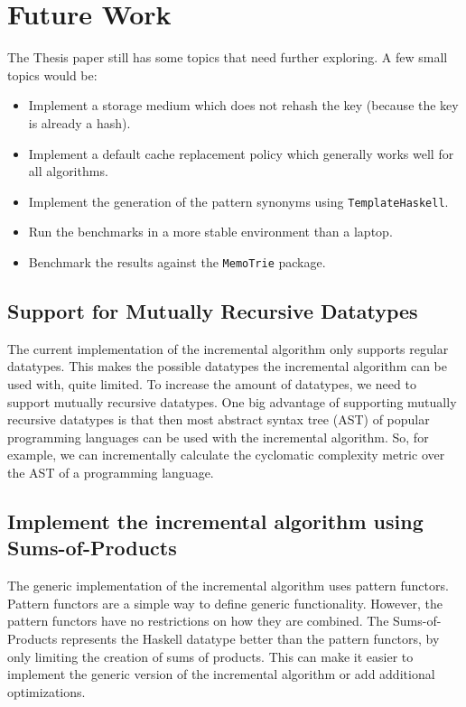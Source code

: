 \section{Future Work}

The Thesis paper still has some topics that need further exploring. A few small topics would be: 
\begin{itemize}
  \item Implement a storage medium which does not rehash the key (because the key is already a hash).
  \item Implement a default cache replacement policy which generally works well for all algorithms. 
  \item Implement the generation of the pattern synonyms using \texttt{TemplateHaskell}.
  \item Run the benchmarks in a more stable environment than a laptop.
  \item Benchmark the results against the \texttt{MemoTrie} package.
\end{itemize}

\subsection{Support for Mutually Recursive Datatypes}
The current implementation of the incremental algorithm only supports regular datatypes. This makes the possible datatypes the incremental algorithm can be used with, quite limited. To increase the amount of datatypes, we need to support mutually recursive datatypes. One big advantage of supporting mutually recursive datatypes is that then most abstract syntax tree (AST) of popular programming languages can be used with the incremental algorithm. So, for example, we can incrementally calculate the cyclomatic complexity metric over the AST of a programming language. 

\pagebreak
\subsection{Implement the incremental algorithm using Sums-of-Products}
The generic implementation of the incremental algorithm uses pattern functors. Pattern functors are a simple way to define generic functionality. However, the pattern functors have no restrictions on how they are combined. The Sums-of-Products represents the Haskell datatype better than the pattern functors, by only limiting the creation of sums of products. This can make it easier to implement the generic version of the incremental algorithm or add additional optimizations.

